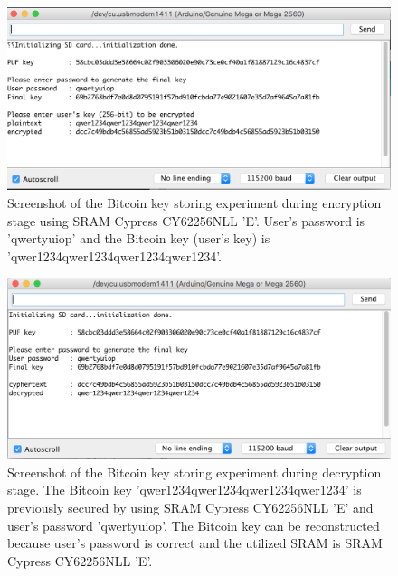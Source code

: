 \begin{figure}[tph!]
    \centerline{\includegraphics[width={\textwidth}]{images/E_encrypt}}
    \caption{Screenshot of the Bitcoin key storing experiment during encryption stage using SRAM Cypress CY62256NLL 'E'.
    User's password is 'qwertyuiop' and the Bitcoin key (user's key) is 'qwer1234qwer1234qwer1234qwer1234'.}
    \label{fig:E_encrypt}
\end{figure}

\begin{figure}[tph!]
    \centerline{\includegraphics[width={\textwidth}]{images/E_decrypt_correct}}
    \caption{Screenshot of the Bitcoin key storing experiment during decryption stage. The Bitcoin key 'qwer1234qwer1234qwer1234qwer1234' is previously secured by using SRAM Cypress CY62256NLL 'E' and user's password 'qwertyuiop'.
    The Bitcoin key can be reconstructed because user's password is correct and the utilized SRAM is SRAM Cypress CY62256NLL 'E'.}
    \label{fig:E_decrypt_correct}
\end{figure}

